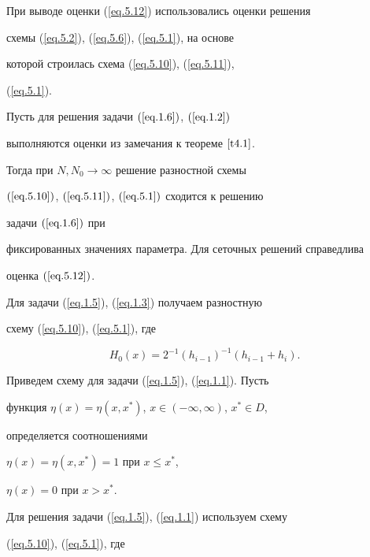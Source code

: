 При выводе оценки (\ref{eq.5.12}) использовались оценки решения


схемы (\ref{eq.5.2}), (\ref{eq.5.6}), (\ref{eq.5.1}), на основе


которой строилась схема (\ref{eq.5.10}), (\ref{eq.5.11}),


(\ref{eq.5.1}).





\begin{lems} \label{l5.3}


Пусть для решения задачи $(\ref{eq.1.6})$, $(\ref{eq.1.2})$


выполняются оценки из замечания к теореме $\ref{t4.1}$.


Тогда при $N, N_0\to \infty$ решение разностной схемы


$(\ref{eq.5.10})$, $(\ref{eq.5.11})$, $(\ref{eq.5.1})$ сходится к решению


задачи $(\ref{eq.1.6})$ при


фиксированных значениях параметра. Для сеточных решений справедлива


оценка $(\ref{eq.5.12})$.


\end{lems}





Для задачи (\ref{eq.1.5}), (\ref{eq.1.3}) получаем разностную


схему (\ref{eq.5.10}), (\ref{eq.5.1}), где


\begin{equation}


\label{eq.5.13}


H_0(x)=2^{-1}{(h_{i-1})}^{-1}(h_{i-1}+h_i).


\end{equation}





Приведем схему для задачи (\ref{eq.1.5}), (\ref{eq.1.1}). Пусть


функция $\eta(x)=\eta(x,x^*)$, $x\in (-\infty, \infty)$, $x^*\in D$,


определяется соотношениями


$\eta(x)=\eta(x, x^*)=1$ при $x\le x^*$, 


$\eta(x)=0$ при $ x> x^*$.


Для решения задачи (\ref{eq.1.5}), (\ref{eq.1.1}) используем схему


(\ref{eq.5.10}), (\ref{eq.5.1}), где


